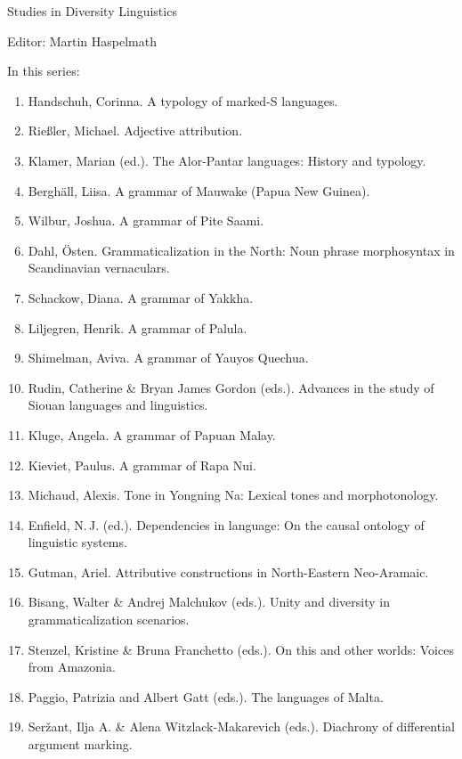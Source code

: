 {\large Studies in Diversity Linguistics}

\bigskip

Editor: Martin Haspelmath  

 
\bigskip 
In this series:

 



\begin{multicols}{2}
\footnotesize

\begin{enumerate}
\item Handschuh, Corinna. A typology of marked-S languages.
\item Rießler, Michael. Adjective attribution.
\item Klamer, Marian (ed.). The Alor-Pantar languages: History and typology.
\item Berghäll, Liisa. A grammar of Mauwake (Papua New Guinea).
\item Wilbur, Joshua. A grammar of Pite Saami.
\item Dahl, Östen. Grammaticalization in the North: Noun phrase morphosyntax in Scandinavian vernaculars.
\item Schackow, Diana.    A grammar of Yakkha.
\item Liljegren, Henrik. A grammar of Palula.
\item Shimelman, Aviva. A grammar of Yauyos Quechua.
\item Rudin, Catherine \& Bryan James Gordon (eds.). Advances in the study of Siouan languages and linguistics.
\item Kluge, Angela. A grammar of Papuan Malay.
\item Kieviet, Paulus. A grammar of Rapa Nui.
\item Michaud, Alexis. Tone in Yongning Na: Lexical tones and morphotonology.
\item Enfield, N.\,J. (ed.).  Dependencies in language: On the causal ontology of linguistic systems.
\item Gutman, Ariel. Attributive constructions in North-Eastern Neo-Aramaic.
\item Bisang, Walter \& Andrej Malchukov (eds.). Unity and diversity in grammaticalization scenarios.
\item Stenzel, Kristine \& Bruna Franchetto (eds.). On this and other worlds: Voices from Amazonia.
\item Paggio, Patrizia and Albert Gatt (eds.). The languages of Malta.
\item Seržant, Ilja A.  \& Alena Witzlack-Makarevich (eds.). Diachrony of differential argument marking.

\end{enumerate}
\end{multicols}
